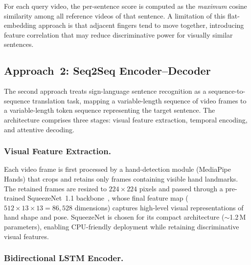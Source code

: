 \documentclass[runningheads]{llncs}
\begin{document}
For each query video, the per-sentence score is computed as the
\emph{maximum} cosine similarity among all reference videos of that
sentence.
A limitation of this flat-embedding approach is that adjacent fingers
tend to move together, introducing feature correlation that may reduce
discriminative power for visually similar sentences.

\subsection{Approach~2: Seq2Seq Encoder--Decoder}\label{sec:seq2seq_method}

The second approach treats sign-language sentence recognition as a
sequence-to-sequence translation task, mapping a variable-length
sequence of video frames to a variable-length token sequence
representing the target sentence.
The architecture comprises three stages: visual feature extraction,
temporal encoding, and attentive decoding.

\subsubsection{Visual Feature Extraction.}\label{sec:cnn_features}

Each video frame is first processed by a hand-detection module
(MediaPipe Hands) that crops and retains only frames containing
visible hand landmarks.
The retained frames are resized to $224 \times 224$ pixels and
passed through a pre-trained SqueezeNet~1.1
backbone~\cite{iandola2016squeezenet}, whose final feature map
($512 \times 13 \times 13 = 86{,}528$ dimensions) captures
high-level visual representations of hand shape and pose.
SqueezeNet is chosen for its compact architecture
($\sim$1.2\,M parameters), enabling CPU-friendly deployment while
retaining discriminative visual features.

\subsubsection{Bidirectional LSTM Encoder.}\label{sec:encoder}
\end{document}
